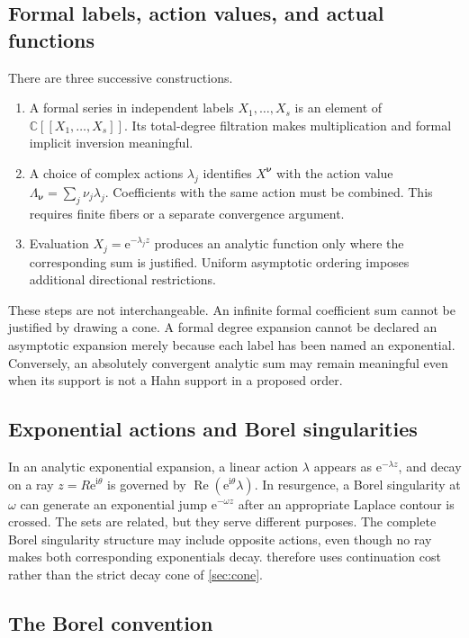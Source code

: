 \documentclass[11pt,a4paper]{article}
\numberwithin{equation}{section}
\theoremstyle{definition}
\theoremstyle{remark}
\newcommand{\C}{\mathbb C}
\newcommand{\ii}{\mathrm i}
\newcommand{\e}{\mathrm e}
\newcommand{\Rea}{\operatorname{Re}}
\newcommand{\nn}{\boldsymbol\nu}
\begin{document}
\subsection{Formal labels, action values, and actual functions}

There are three successive constructions.
\begin{enumerate}
\item A formal series in independent labels $X_1,\ldots,X_s$ is an element of
$\C[[X_1,\ldots,X_s]]$. Its total-degree filtration makes multiplication and
formal implicit inversion meaningful.
\item A choice of complex actions $\lambda_j$ identifies $X^{\nn}$ with the
action value $\Lambda_{\nn}=\sum_j\nu_j\lambda_j$. Coefficients with the same
action must be combined. This requires finite fibers or a separate convergence
argument.
\item Evaluation $X_j=\e^{-\lambda_j z}$ produces an analytic function only
where the corresponding sum is justified. Uniform asymptotic ordering imposes
additional directional restrictions.
\end{enumerate}
These steps are not interchangeable. An infinite formal coefficient sum cannot
be justified by drawing a cone. A formal degree expansion cannot be declared
an asymptotic expansion merely because each label has been named an exponential.
Conversely, an absolutely convergent analytic sum may remain meaningful even
when its support is not a Hahn support in a proposed order.

\subsection{Exponential actions and Borel singularities}

In an analytic exponential expansion, a linear action $\lambda$ appears as
$\e^{-\lambda z}$, and decay on a ray $z=R\e^{\ii\theta}$ is governed by
$\Rea(\e^{\ii\theta}\lambda)$. In resurgence, a Borel singularity at $\omega$
can generate an exponential jump $\e^{-\omega z}$ after an appropriate Laplace
contour is crossed. The sets are related, but they serve different purposes.
The complete Borel singularity structure may include opposite actions, even
though no ray makes both corresponding exponentials decay. 
therefore uses continuation cost rather than the strict decay cone of
\cref{sec:cone}.

\subsection{The Borel convention}
\end{document}
